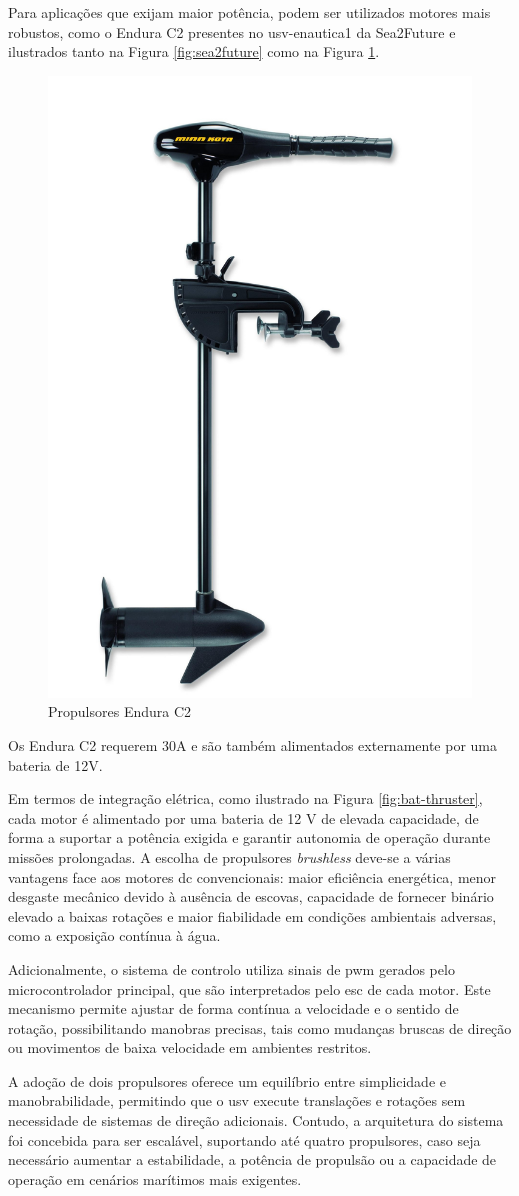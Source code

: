 Para aplicações que exijam maior potência, podem ser utilizados motores mais robustos, como o Endura C2 \cite{datasheet-endura-c2} presentes no \gls{usv}-enautica1 da Sea2Future \cite{sea2future} \cite{sea2future2} e ilustrados tanto na Figura \ref{fig:sea2future} como na Figura \ref{fig:endura-c2}.

\begin{figure}[H]
    \centering
    \includegraphics[width=0.33\linewidth]{figuras/endura-c2.jpg}
    \caption[Propulsores Endura C2]{Propulsores Endura C2 \cite{datasheet-endura-c2}}
    \label{fig:endura-c2}
\end{figure}

Os Endura C2 requerem 30A e são também alimentados externamente por uma bateria de 12V.

Em termos de integração elétrica, como ilustrado na Figura \ref{fig:bat-thruster}, cada motor é alimentado por uma bateria de 12 V de elevada capacidade, de forma a suportar a potência exigida e garantir autonomia de operação durante missões prolongadas. A escolha de propulsores \emph{brushless} deve-se a várias vantagens face aos motores \gls{dc} convencionais: maior eficiência energética, menor desgaste mecânico devido à ausência de escovas, capacidade de fornecer binário elevado a baixas rotações e maior fiabilidade em condições ambientais adversas, como a exposição contínua à água.

Adicionalmente, o sistema de controlo utiliza sinais de \gls{pwm} gerados pelo microcontrolador principal, que são interpretados pelo \gls{esc} de cada motor. Este mecanismo permite ajustar de forma contínua a velocidade e o sentido de rotação, possibilitando manobras precisas, tais como mudanças bruscas de direção ou movimentos de baixa velocidade em ambientes restritos.

A adoção de dois propulsores oferece um equilíbrio entre simplicidade e manobrabilidade, permitindo que o \gls{usv} execute translações e rotações sem necessidade de sistemas de direção adicionais. Contudo, a arquitetura do sistema foi concebida para ser escalável, suportando até quatro propulsores, caso seja necessário aumentar a estabilidade, a potência de propulsão ou a capacidade de operação em cenários marítimos mais exigentes.

